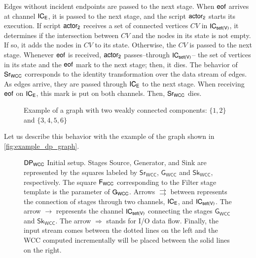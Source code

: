   Edges without incident endpoints are passed to the next stage. When $\mathsf{eof}$ arrives at channel $\mathsf{IC_E}$, it is passed to the next stage, and the script $\mathsf{actor_2}$ starts its execution. 
  If script $\mathsf{actor_2}$ receives a set of connected vertices $CV$ in $\mathsf{IC_{set(V)}}$, it determines if the intersection between $CV$ and the nodes in its state is not empty. If so, it adds the nodes in $CV$  to its state. 
  Otherwise, the $CV$ is passed to the next stage.  Whenever $\mathsf{eof}$ is received, $\mathsf{actor_2}$ passes--through $\mathsf{IC_{set(V)}}$-- the set of vertices in its state and the $\mathsf{eof}$ mark to the next stage; then, it dies.
  The behavior of $\mathsf{Sr_{WCC}}$ corresponds to the identity transformation over the data stream of edges.  As edges arrive, they are passed through  $\mathsf{IC_E}$ to the next stage. When receiving $\mathsf{eof}$ on $\mathsf{IC_E}$, this mark is put on both channels. 
  Then, $\mathsf{Sr_{WCC}}$ dies. 
  
  \begin{figure}
   \begin{center}
  \end{center}
  \caption[{[PoC] Graph WCC Example}]{Example of a graph with two weakly connected components: $\{1,2\}$ and $\{3,4,5,6\}$}
  \label{fig:example_dp_graph}
  \end{figure}
  
  Let us describe this behavior with the example of the graph shown in \autoref{fig:example_dp_graph}.
  
  \begin{figure}[h!]
    \centering
  \caption[{[PoC] $\dpwcc$ Initial Setup}]{$\dpwcc$ Initial setup. Stages Source, Generator, and Sink are represented by the squares labeled by $\mathsf{Sr_{WCC}}$, $\mathsf{G_{WCC}}$ and $\mathsf{Sk_{WCC}}$, respectively.  The square $\mathsf{F_{WCC}}$ corresponding to the Filter stage template is the parameter of $\mathsf{G_{WCC}}$. Arrows $\rightrightarrows$ between represents the connection of stages through two channels, $\mathsf{IC_E}$, and $\mathsf{IC_{set(V)}}$. The arrow  $\rightarrow$ represents the channel $\mathsf{IC_{set(V)}}$ connecting the stages $\mathsf{G_{WCC}}$ and $\mathsf{Sk_{WCC}}$. The arrow $\Longrightarrow$ stands for I/O data flow. Finally, the input stream comes between the dotted lines on the left and the WCC computed incrementally will be placed between the solid lines on the right.}
  \label{fig:dp_example_0}
  \end{figure}
  
